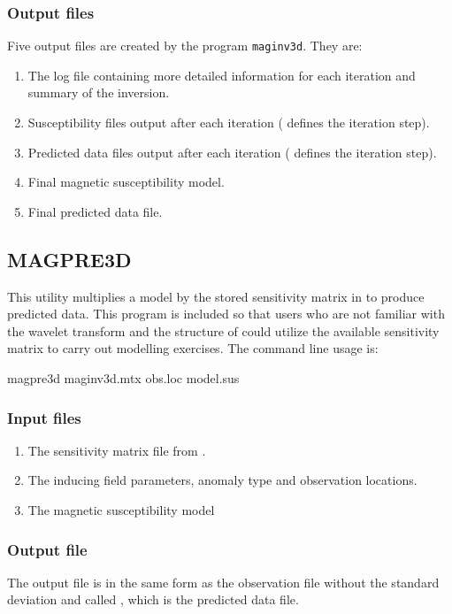 \subsubsection{Output files}
Five output files are created by the program \texttt{maginv3d}. They are:
\begin{enumerate}
\item {} The log file containing more detailed information for each iteration and summary of the inversion.
\item {} Susceptibility files output after each iteration ( defines the iteration step).
\item {} Predicted data files output after each iteration ( defines the iteration step).
\item {} Final magnetic susceptibility model.
\item {} Final predicted data file.
\end{enumerate}

\subsection{MAGPRE3D}
This utility multiplies a model by the stored sensitivity matrix in  to produce predicted data. This program is included so that users who are not familiar with the wavelet transform and the structure of  could utilize the available sensitivity matrix to carry out modelling exercises. The command line usage is:
\begin{fileExample}
magpre3d maginv3d.mtx obs.loc model.sus
\end{fileExample}

\subsubsection{Input files}
\begin{enumerate}
\item {} The sensitivity matrix file from .
\item {} The inducing field parameters, anomaly type and observation locations.
\item {} The magnetic susceptibility model
\end{enumerate}

\subsubsection{Output file}
The output file is in the same form as the observation file without the standard deviation and called , which is the predicted data file.
